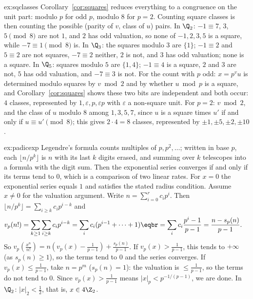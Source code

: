 \begin{solution}{ex:sqclasses}
\idea Corollary~\ref{cor:squares} reduces everything to a congruence on the unit part: modulo $p$ for odd $p$, modulo $8$ for $p=2$. Counting square classes is then counting the possible (parity of $v$, class of $u$) pairs.
\writeup In $\Q_2$: $-1\equiv7$, $3$, $5\pmod8$ are not $1$, and $2$ has odd valuation, so none of $-1,2,3,5$ is a square, while $-7\equiv1\pmod8$ is. In $\Q_3$: the squares modulo $3$ are $\{1\}$; $-1\equiv2$ and $5\equiv2$ are not squares, $-7\equiv2$ neither, $2$ is not, and $3$ has odd valuation; none is a square. In $\Q_5$: squares modulo $5$ are $\{1,4\}$; $-1\equiv4$ is a square, $2$ and $3$ are not, $5$ has odd valuation, and $-7\equiv3$ is not. For the count with $p$ odd: $x=p^vu$ is determined modulo squares by $v\bmod2$ and by whether $u\bmod p$ is a square, and Corollary~\ref{cor:squares} shows these two bits are independent and both occur: $4$ classes, represented by $1,\varepsilon,p,\varepsilon p$ with $\varepsilon$ a non-square unit. For $p=2$: $v\bmod2$, and the class of $u$ modulo $8$ among $1,3,5,7$, since $u$ is a square times $u'$ if and only if $u\equiv u'\pmod8$; this gives $2\cdot4=8$ classes, represented by $\pm1,\pm5,\pm2,\pm10$.
\end{solution}

\begin{solution}{ex:padicexp}
\idea Legendre's formula counts multiples of $p,p^2,\dots$; written in base $p$, each $\lfloor n/p^k\rfloor$ is $n$ with its last $k$ digits erased, and summing over $k$ telescopes into a formula with the digit sum. Then the exponential series converges if and only if its terms tend to $0$, which is a comparison of two linear rates.
\writeup For $x=0$ the exponential series equals $1$ and satisfies the stated radius condition. Assume $x\ne0$ for the valuation argument. Write $n=\sum_{i=0}^rc_ip^i$. Then $\lfloor n/p^k\rfloor=\sum_{i\ge k}c_ip^{i-k}$ and
\[
\begin{aligned}v_p(n!)&=\sum_{k\ge1}\sum_{i\ge k}c_ip^{i-k}=\sum_ic_i(p^{i-1}+\dots+1)\eqbr=\sum_ic_i\frac{p^i-1}{p-1}=\frac{n-s_p(n)}{p-1}.\end{aligned}
\]
So $v_p\left(\frac{x^n}{n!}\right)=n\left(v_p(x)-\frac1{p-1}\right)+\frac{s_p(n)}{p-1}$. If $v_p(x)>\frac1{p-1}$, this tends to $+\infty$ (as $s_p(n)\ge1$), so the terms tend to $0$ and the series converges. If $v_p(x)\le\frac1{p-1}$, take $n=p^m$ ($s_p(n)=1$): the valuation is $\le\frac1{p-1}$, so the terms do not tend to $0$. Since $v_p(x)>\frac1{p-1}$ means $|x|_p<p^{-1/(p-1)}$, we are done. In $\Q_2$: $|x|_2<\frac12$, that is, $x\in4\Z_2$.
\end{solution}

